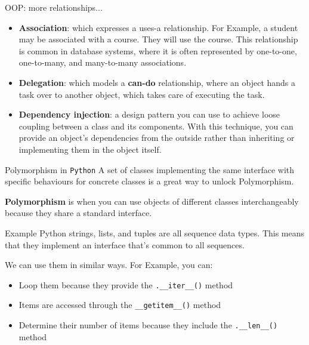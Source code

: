 \documentclass[10pt]{beamer}
\begin{document}
\begin{frame}[fragile]{OOP: more relationships...}
\begin{itemize}
\item \textbf{Association}: which expresses a uses-a relationship. For Example, a student may be associated with a course. They will use the course. This relationship is common in database systems, where it is often represented by one-to-one, one-to-many, and many-to-many associations. 
\item \textbf{Delegation}: which models a \textbf{can-do} relationship, where an object hands a task over to another object, which takes care of executing the task.
\item \textbf{Dependency injection}: a design pattern you can use to achieve loose coupling between a class and its components. With this technique, you can provide an object's dependencies from the outside rather than inheriting or implementing them in the object itself.
\end{itemize}
\end{frame}

\begin{frame}[fragile]{Polymorphism in \texttt{Python}}
A set of classes implementing the same interface with specific behaviours for concrete classes is a great way to unlock Polymorphism.

\textbf{Polymorphism} is when you can use objects of different classes interchangeably because they share a standard interface. 

\begin{block}{Example}
\vspace{0.1cm}
Python strings, lists, and tuples are all sequence data types. This means that they implement an interface that's common to all sequences.
\end{block}

We can use them in similar ways. For Example, you can:

\begin{itemize}
\item Loop them because they provide the \texttt{.\_\_iter\_\_()} method
\item Items are accessed through the \texttt{\_\_getitem\_\_()} method
\item Determine their number of items because they include the \texttt{.\_\_len\_\_()} method

\end{itemize}

\end{frame}
\end{document}
